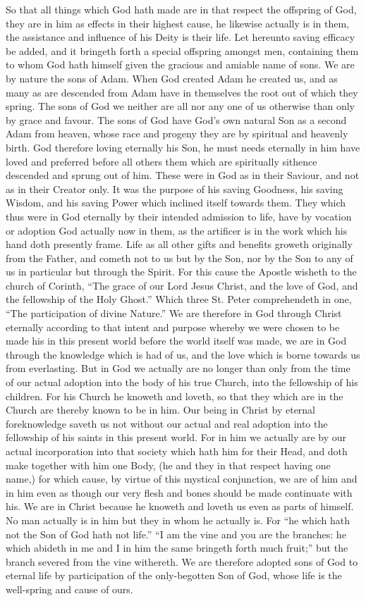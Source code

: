 So that all things which God hath made are in that respect the offspring of God, they are in him as effects in their highest cause, he likewise actually is in them, the assistance and influence of his Deity is their life.
Let hereunto saving efficacy be added, and it bringeth forth a special offspring amongst men, containing them to whom God hath himself given the gracious and amiable name of sons. We are by nature the sons of Adam. When God created Adam he created us, and as many as are descended from Adam have in themselves the root out of which they spring. The sons of God we neither are all nor any one of us otherwise than only by grace and favour. The sons of God have God’s own natural Son as a second Adam from heaven, whose race and progeny they are by spiritual and heavenly birth. God therefore loving eternally his Son, he must needs eternally in him have loved and preferred before all others them which are spiritually sithence descended and sprung out of him. These were in God as in their Saviour,  and not as in their Creator only. It was the purpose of his saving Goodness, his saving Wisdom, and his saving Power which inclined itself towards them.
They which thus were in God eternally by their intended admission to life, have by vocation or adoption God actually now in them, as the artificer is in the work which his hand doth presently frame. Life as all other gifts and benefits groweth originally from the Father, and cometh not to us but by the Son, nor by the Son to any of us in particular but through the Spirit. For this cause the Apostle wisheth to the church of Corinth, “The grace of our Lord Jesus Christ, and the love of God, and the fellowship of the Holy Ghost.” Which three St. Peter comprehendeth in one, “The participation of divine Nature.” We are therefore in God through Christ eternally according to that intent and purpose whereby we were chosen to be made his in this present world before the world itself was made, we are in God through the knowledge which is had of us, and the love which is borne towards us from everlasting. But in God we actually are no longer than only from the time of our actual adoption into the body of his true Church, into the fellowship of his children. For his Church he knoweth and loveth, so that they which are in the Church are thereby known to be in him. Our being in Christ by eternal foreknowledge saveth us not without our actual and real adoption into the fellowship of his saints in this present world. For in him we actually are by our actual incorporation into that society which hath him for their Head, and doth make together with him one Body, (he and they in that respect having one name,) for which cause, by virtue of this mystical conjunction, we are of him and in him even as though our very flesh and bones should be made continuate with his. We are in Christ because he knoweth and loveth us even as parts of himself. No man actually is in him but they in whom he actually is. For “he which hath not the Son of God hath not life.” “I am the vine and you are the branches: he which abideth in me and I in him the same bringeth forth much fruit;” but  the branch severed from the vine withereth. We are therefore adopted sons of God to eternal life by participation of the only-begotten Son of God, whose life is the well-spring and cause of ours.
